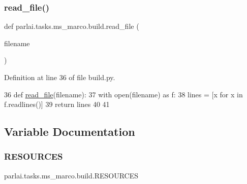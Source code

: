\mbox{\label{namespaceparlai_1_1tasks_1_1ms__marco_1_1build_a8e7fee7824a3a7aa1facadf9979f3f4a}} 
\subsubsection{\texorpdfstring{read\+\_\+file()}{read\_file()}}
{\footnotesize\ttfamily def parlai.\+tasks.\+ms\+\_\+marco.\+build.\+read\+\_\+file (\begin{DoxyParamCaption}\item[{}]{filename }\end{DoxyParamCaption})}



Definition at line 36 of file build.\+py.


\begin{DoxyCode}
36 \textcolor{keyword}{def }\hyperlink{namespaceparlai_1_1tasks_1_1ms__marco_1_1build_a8e7fee7824a3a7aa1facadf9979f3f4a}{read\_file}(filename):
37     with open(filename) \textcolor{keyword}{as} f:
38         lines = [x \textcolor{keywordflow}{for} x \textcolor{keywordflow}{in} f.readlines()]
39     \textcolor{keywordflow}{return} lines
40 
41 
\end{DoxyCode}


\subsection{Variable Documentation}
\mbox{\label{namespaceparlai_1_1tasks_1_1ms__marco_1_1build_af344d1660233d915e9e6efa8ceccb22b}} 
\subsubsection{\texorpdfstring{R\+E\+S\+O\+U\+R\+C\+ES}{RESOURCES}}
{\footnotesize\ttfamily parlai.\+tasks.\+ms\+\_\+marco.\+build.\+R\+E\+S\+O\+U\+R\+C\+ES}



